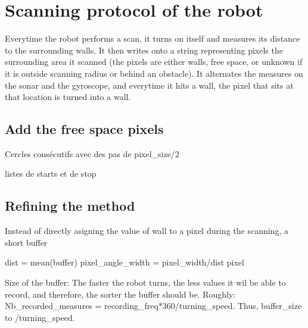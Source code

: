 \documentclass[a4paper,10pt]{article}
\title{}
\author{}
\begin{document}
\maketitle

\begin{abstract}

\end{abstract}

\section{Scanning protocol of the robot}
Everytime the robot performs a scan, it turns on itself and measures its distance to the surrounding walls. 
It then writes onto a string representing pixels the surrounding area it scanned (the pixels are either walls, free space, or unknown if it is outside scanning radius or behind an obstacle).
It alternates the measures on the sonar and the gyroscope, and everytime it hits a wall, the pixel that sits at that location is turned into a wall.


\subsection{Add the free space pixels}
Cercles consécutifs avec des pas de pixel_size/2

listes de starts et de stop 

\subsection{Refining the method}
Instead of directly asigning the value of wall to a pixel during the scanning, a short buffer 

dist = mean(buffer)
pixel_angle_width = pixel_width/dist
pixel

Size of the buffer:
The faster the robot turns, the less values it wil be able to record, and therefore, the sorter the buffer should be.
Roughly:
Nb_recorded_measures = recording_freq*360/turning_speed.
Thus, buffer_size \linear to \alpha/turning_speed.
\end{document}
